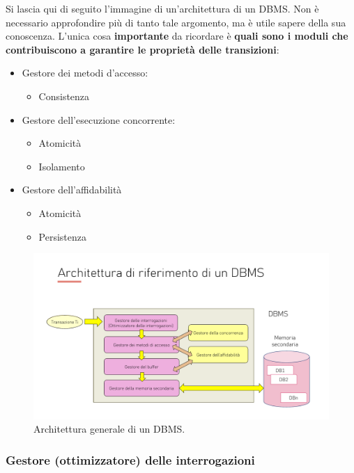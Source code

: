 \documentclass[a4paper]{article}
\begin{document}
	Si lascia qui di seguito l'immagine di un'architettura di un DBMS. Non è necessario approfondire più di tanto tale argomento, ma è utile sapere della sua conoscenza. L'unica cosa \textbf{importante} da ricordare è \textbf{quali sono i moduli che contribuiscono a garantire le proprietà delle transizioni}:
	\begin{itemize}
		\item Gestore dei metodi d'accesso:
		\begin{itemize}
			\item Consistenza
		\end{itemize}
		
		\item Gestore dell'esecuzione concorrente:
		\begin{itemize}
			\item Atomicità
			\item Isolamento
		\end{itemize}
	
		\item Gestore dell'affidabilità
		\begin{itemize}
			\item Atomicità
			\item Persistenza
		\end{itemize}
	\end{itemize}
	
	\begin{figure}[!htp]
		\centering
		\includegraphics[width=\textwidth]{img/architettura_DBMS.pdf}
		\caption{Architettura generale di un DBMS.}
	\end{figure}\newpage
	
	\subsubsection{Gestore (ottimizzatore) delle interrogazioni}
	
\end{document}
